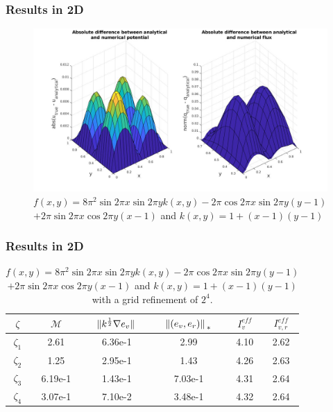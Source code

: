 \documentclass[t]{beamer}
\begin{document}
\begin{frame}
\frametitle{Results in 2D}
\begin{figure}
\centering
\includegraphics[width = 0.9\linewidth]{../../Images/absnorm.jpg}
\caption{$f(x,y) = 8\pi^2\sin{2\pi x}\sin{2\pi y}k(x,y) - 2\pi\cos{2\pi x}\sin{2\pi y}(y-1)$ $+ 2\pi\sin{2\pi x}\cos{2\pi y}(x-1) $ and 
$k(x,y) = 1 + (x-1)(y-1)$}
\end{figure}	
\end{frame}

\begin{frame}[c]
\frametitle{Results in 2D}
\begin{table}[c]
\begin{tabular}{c | c | c | c | c | c } 
$\zeta$ & $\mathcal{M}$  & $\norm*{k^{\frac{1}{2}}\nabla e_v}$ & $\norm*{(e_v,e_r)}_{*}$ & $I_v^{eff}$ & $I_{v,r}^{eff}$ \\
\hline \hline
$\zeta_1$ & 2.61 & 6.36e-1 & 2.99 & 4.10 & 2.62 \\ 
$\zeta_2$ & 1.25 & 2.95e-1 & 1.43 & 4.26 & 2.63 \\
$\zeta_3$ & 6.19e-1 & 1.43e-1& 7.03e-1 & 4.31 & 2.64 \\
$\zeta_4$ & 3.07e-1 & 7.10e-2 & 3.48e-1 & 4.32 & 2.64 \\
\end{tabular}
\caption{$f(x,y) = 8\pi^2\sin{2\pi x}\sin{2\pi y}k(x,y) - 2\pi\cos{2\pi x}\sin{2\pi y}(y-1)$ $+ 2\pi\sin{2\pi x}\cos{2\pi y}(x-1) $ and 
$k(x,y) = 1 + (x-1)(y-1)$ with a grid refinement of $2^4$.}
\end{table}

\end{frame}
\end{document}

